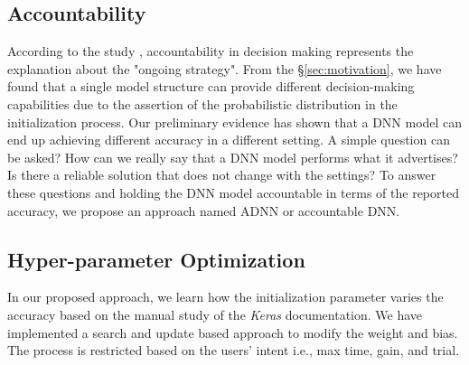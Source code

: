 \subsection{Accountability}
According to the study \cite{veale2018fairness}, accountability in decision making represents the explanation about the "ongoing strategy". From the \S\ref{sec:motivation}, we have found that a single model structure can provide different decision-making capabilities due to the assertion of the probabilistic distribution in the initialization process. Our preliminary evidence has shown that a DNN model can end up achieving different accuracy in a different setting. A simple question can be asked? How can we really say that a DNN model performs what it advertises? Is there a reliable solution that does not change with the settings?
To answer these questions and holding the DNN model accountable in terms of the reported accuracy, we propose an approach named ADNN or accountable DNN.

\subsection{Hyper-parameter Optimization}

In our proposed approach, we learn how the initialization parameter varies the accuracy based on the manual study of the \emph{Keras} documentation. We have implemented a search and update based approach to modify the weight and bias. The process is restricted based on the users’ intent i.e., max time, gain, and trial.


